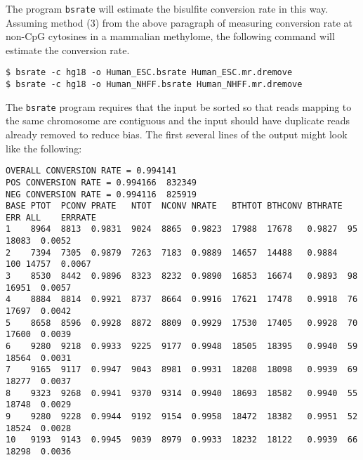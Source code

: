 \documentclass[10pt]{article}
\newcommand{\prog}[1]{\texttt{#1}}
\begin{document}
The program \prog{bsrate} will estimate the bisulfite conversion rate
in this way. Assuming method (3) from the above paragraph of measuring
conversion rate at non-CpG cytosines in a mammalian methylome, the
following command will estimate the conversion rate.
\begin{verbatim}
$ bsrate -c hg18 -o Human_ESC.bsrate Human_ESC.mr.dremove
$ bsrate -c hg18 -o Human_NHFF.bsrate Human_NHFF.mr.dremove
\end{verbatim}
The \prog{bsrate} program requires that the input be sorted so that
reads mapping to the same chromosome are contiguous and the input should
have duplicate reads already removed to reduce bias. The first several
lines of the output might look like the following:
{\small{%
\begin{verbatim}
OVERALL CONVERSION RATE = 0.994141
POS CONVERSION RATE = 0.994166  832349
NEG CONVERSION RATE = 0.994116  825919
BASE PTOT  PCONV PRATE   NTOT  NCONV NRATE   BTHTOT BTHCONV BTHRATE ERR ALL    ERRRATE
1    8964  8813  0.9831  9024  8865  0.9823  17988  17678   0.9827  95  18083  0.0052
2    7394  7305  0.9879  7263  7183  0.9889  14657  14488   0.9884  100 14757  0.0067
3    8530  8442  0.9896  8323  8232  0.9890  16853  16674   0.9893  98  16951  0.0057
4    8884  8814  0.9921  8737  8664  0.9916  17621  17478   0.9918  76  17697  0.0042
5    8658  8596  0.9928  8872  8809  0.9929  17530  17405   0.9928  70  17600  0.0039
6    9280  9218  0.9933  9225  9177  0.9948  18505  18395   0.9940  59  18564  0.0031
7    9165  9117  0.9947  9043  8981  0.9931  18208  18098   0.9939  69  18277  0.0037
8    9323  9268  0.9941  9370  9314  0.9940  18693  18582   0.9940  55  18748  0.0029
9    9280  9228  0.9944  9192  9154  0.9958  18472  18382   0.9951  52  18524  0.0028
10   9193  9143  0.9945  9039  8979  0.9933  18232  18122   0.9939  66  18298  0.0036
\end{verbatim}%
}}
\end{document}
